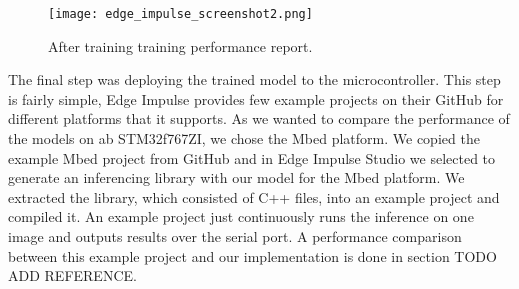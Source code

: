 \begin{figure}[ht]
    \centering
    \texttt{[image: edge\_impulse\_screenshot2.png]} 
    \caption{After training training performance report.}
    \label{edge_impulse_screenshot2}
\end{figure}

The final step was deploying the trained model to the microcontroller.
This step is fairly simple, Edge Impulse provides few example projects on their GitHub for different platforms that it supports.
As we wanted to compare the performance of the models on ab STM32f767ZI, we chose the Mbed platform.
We copied the example Mbed project from GitHub and in Edge Impulse Studio we selected to generate an inferencing library with our model for the Mbed platform.
We extracted the library, which consisted of C++ files, into an example project and compiled it.
An example project just continuously runs the inference on one image and outputs results over the serial port.
A performance comparison between this example project and our implementation is done in section TODO ADD REFERENCE.
